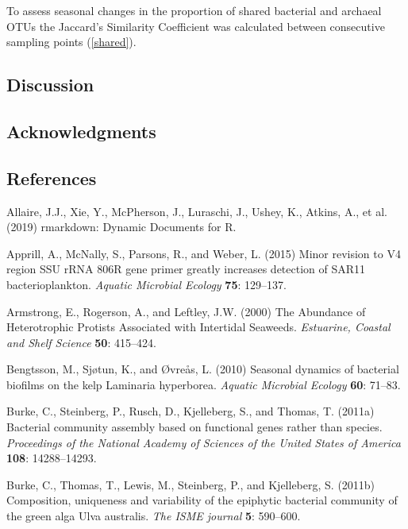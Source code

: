\documentclass[12pt,]{article}
\begin{document}
To assess seasonal changes in the proportion of shared bacterial and
archaeal OTUs the Jaccard's Similarity Coefficient was calculated
between consecutive sampling points (\autoref{shared}).

\hypertarget{discussion}{%
\subsection{Discussion}\label{discussion}}

\hypertarget{acknowledgments}{%
\subsection{Acknowledgments}\label{acknowledgments}}

\newpage

\hypertarget{references}{%
\subsection{References}\label{references}}

\hypertarget{refs}{}
\leavevmode\hypertarget{ref-Allaire2019}{}%
Allaire, J.J., Xie, Y., McPherson, J., Luraschi, J., Ushey, K., Atkins,
A., et al. (2019) rmarkdown: Dynamic Documents for R.

\leavevmode\hypertarget{ref-Apprill2015}{}%
Apprill, A., McNally, S., Parsons, R., and Weber, L. (2015) Minor
revision to V4 region SSU rRNA 806R gene primer greatly increases
detection of SAR11 bacterioplankton. \emph{Aquatic Microbial Ecology}
\textbf{75}: 129--137.

\leavevmode\hypertarget{ref-Armstrong2000}{}%
Armstrong, E., Rogerson, A., and Leftley, J.W. (2000) The Abundance of
Heterotrophic Protists Associated with Intertidal Seaweeds.
\emph{Estuarine, Coastal and Shelf Science} \textbf{50}: 415--424.

\leavevmode\hypertarget{ref-Bengtsson2010}{}%
Bengtsson, M., Sjøtun, K., and Øvreås, L. (2010) Seasonal dynamics of
bacterial biofilms on the kelp Laminaria hyperborea. \emph{Aquatic
Microbial Ecology} \textbf{60}: 71--83.

\leavevmode\hypertarget{ref-Burke2011a}{}%
Burke, C., Steinberg, P., Rusch, D., Kjelleberg, S., and Thomas, T.
(2011a) Bacterial community assembly based on functional genes rather
than species. \emph{Proceedings of the National Academy of Sciences of
the United States of America} \textbf{108}: 14288--14293.

\leavevmode\hypertarget{ref-Burke2011b}{}%
Burke, C., Thomas, T., Lewis, M., Steinberg, P., and Kjelleberg, S.
(2011b) Composition, uniqueness and variability of the epiphytic
bacterial community of the green alga Ulva australis. \emph{The ISME
journal} \textbf{5}: 590--600.
\end{document}
